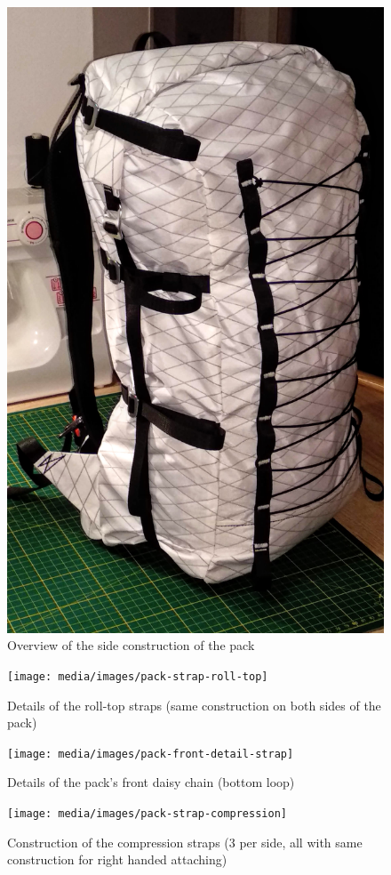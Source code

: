 \begin{figure}[H]
  \centering
  \includegraphics[width=.75\textwidth]{media/images/pack-side-full}
  \caption{Overview of the side construction of the pack}
  \label{img:pack-side-full}
\end{figure}

\begin{figure}[H]
  \texttt{[image: media/images/pack-strap-roll-top]}
  \caption{Details of the roll-top straps (same construction on both sides of the pack)}
  \label{img:pack-strap-roll-top}
\end{figure}

\begin{figure}[H]
  \texttt{[image: media/images/pack-front-detail-strap]}
  \caption{Details of the pack's front daisy chain (bottom loop)}
  \label{img:pack-front-detail-strap}
\end{figure}


\begin{figure}[H]
  \texttt{[image: media/images/pack-strap-compression]}
  \caption{Construction of the compression straps (3 per side, all with same construction for right handed attaching)}
  \label{img:pack-strap-compression}
\end{figure}

